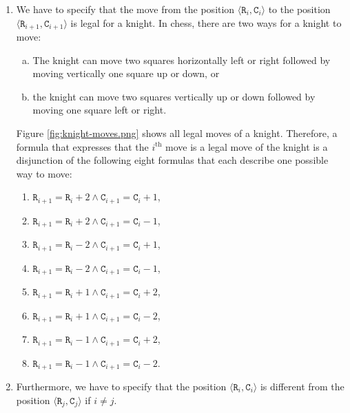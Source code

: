 \begin{enumerate}
\item We have to specify that the move from the position $\langle \mathtt{R}_i, \mathtt{C}_i \rangle$
      to the position $\langle \mathtt{R}_{i+1}, \mathtt{C}_{i+1} \rangle$ is legal for a knight.
      In chess, there are two ways for a knight to move:
      \begin{enumerate}[(a)]
      \item The knight can move two squares horizontally left or right followed by moving vertically
            one square up or down, or
      \item the knight can move two squares vertically up or down followed by moving
            one square left or right.
      \end{enumerate}
      Figure \ref{fig:knight-moves.png} shows all legal moves of a knight.
      Therefore, a formula that expresses that the $i^{\mathrm{th}}$ move is a legal move of the knight is a disjunction
      of the following eight formulas that each describe one possible way to move:
      \begin{enumerate}
      \item $\mathtt{R}_{i+1} = \mathtt{R}_{i} + 2 \wedge \mathtt{C}_{i+1} = \mathtt{C}_{i} + 1$,
      \item $\mathtt{R}_{i+1} = \mathtt{R}_{i} + 2 \wedge \mathtt{C}_{i+1} = \mathtt{C}_{i} - 1$, 
      \item $\mathtt{R}_{i+1} = \mathtt{R}_{i} - 2 \wedge \mathtt{C}_{i+1} = \mathtt{C}_{i} + 1$, 
      \item $\mathtt{R}_{i+1} = \mathtt{R}_{i} - 2 \wedge \mathtt{C}_{i+1} = \mathtt{C}_{i} - 1$, 
      \item $\mathtt{R}_{i+1} = \mathtt{R}_{i} + 1 \wedge \mathtt{C}_{i+1} = \mathtt{C}_{i} + 2$, 
      \item $\mathtt{R}_{i+1} = \mathtt{R}_{i} + 1 \wedge \mathtt{C}_{i+1} = \mathtt{C}_{i} - 2$, 
      \item $\mathtt{R}_{i+1} = \mathtt{R}_{i} - 1 \wedge \mathtt{C}_{i+1} = \mathtt{C}_{i} + 2$, 
      \item $\mathtt{R}_{i+1} = \mathtt{R}_{i} - 1 \wedge \mathtt{C}_{i+1} = \mathtt{C}_{i} - 2$. 
      \end{enumerate}
\item Furthermore, we have to specify that the position  $\langle \mathtt{R}_i, \mathtt{C}_i \rangle$ is
      different from the position  $\langle \mathtt{R}_j, \mathtt{C}_j \rangle$ if $i \not= j$.
\end{enumerate}


